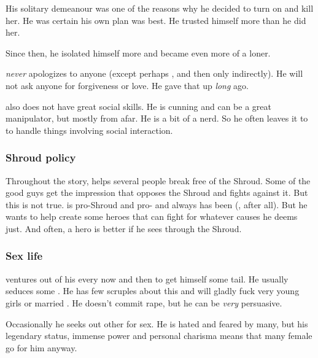 His solitary demeanour was one of the reasons why he decided to turn on \Triestessakhin{} and kill her. 
He was certain his own plan was best. 
He trusted himself more than he did her. 

Since then, he isolated himself more and became even more of a loner. 

\Ishnaruchaefir{} \emph{never} apologizes to anyone (except perhaps \Criseis, and then only indirectly). 
He will not ask anyone for forgiveness or love.
He gave that up \emph{long} ago. 

\Ishnaruchaefir{} also does not have great social skills. 
He is cunning and can be a great manipulator, but mostly from afar. 
He is a bit of a nerd. 
So he often leaves it to \Criseis{} to handle things involving social interaction. 





\subsubsection{Shroud policy}
Throughout the story, \Ishnaruchaefir{} helps several people break free of the Shroud. 
Some of the good guys get the impression that \Ishnaruchaefir{} opposes the Shroud and fights against it. 
But this is not true. 
\Ishnaruchaefir{} is pro-Shroud and pro- and always has been (, after all). 
But he wants to help create some heroes that can fight for whatever causes he deems just. 
And often, a hero is better if he sees through the Shroud. 





\subsubsection{Sex life}
\Ishnaruchaefir{} ventures out of his  every now and then to get himself some tail. 
He usually seduces some \sphyle. 
He has few scruples about this and will gladly fuck very young girls or married \sphyles. 
He doesn't commit rape, but he can be \emph{very} persuasive. 

Occasionally he seeks out other \dragons{} for sex. 
He is hated and feared by many, but his legendary status, immense power and personal charisma means that many female \dragons{} go for him anyway. 

